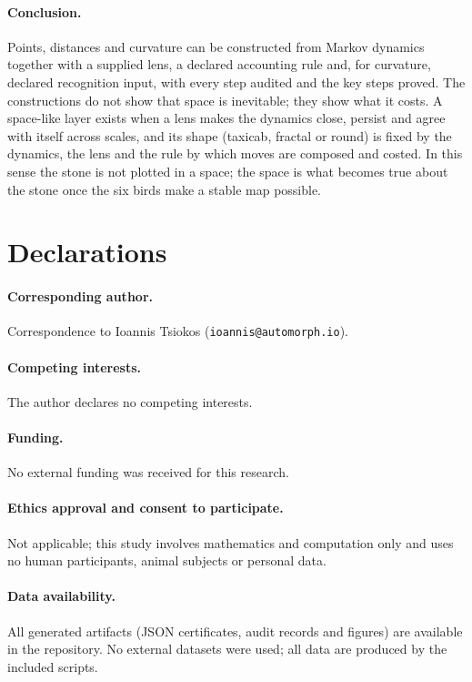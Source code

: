 \documentclass[11pt]{article}
\begin{document}
\paragraph{Conclusion.}
Points, distances and curvature can be constructed from Markov dynamics together with a supplied lens, a declared accounting rule and, for curvature, declared recognition input, with every step audited and the key steps proved.
The constructions do not show that space is inevitable; they show what it costs.
A space-like layer exists when a lens makes the dynamics close, persist and agree with itself across scales, and its shape (taxicab, fractal or round) is fixed by the dynamics, the lens and the rule by which moves are composed and costed.
In this sense the stone is not plotted in a space; the space is what becomes true about the stone once the six birds make a stable map possible.

\section*{Declarations}

\paragraph{Corresponding author.}
Correspondence to Ioannis Tsiokos (\texttt{ioannis@automorph.io}).

\paragraph{Competing interests.}
The author declares no competing interests.

\paragraph{Funding.}
No external funding was received for this research.

\paragraph{Ethics approval and consent to participate.}
Not applicable; this study involves mathematics and computation only and uses no human participants, animal subjects or personal data.

\paragraph{Data availability.}
All generated artifacts (JSON certificates, audit records and figures) are available in the repository. No external datasets were used; all data are produced by the included scripts.
\end{document}
